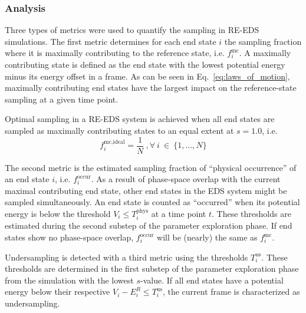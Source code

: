 \subsubsection{Analysis}
\label{metrics}
Three types of metrics were used to quantify the sampling in RE-EDS simulations. The first metric determines for each end state $i$ the sampling fraction where it is maximally contributing to the reference state, i.e. $f_i^{\text{mc}}$. A maximally contributing state is defined as the end state with the lowest potential energy minus its energy offset in a frame. As can be seen in  Eq.~\eqref{eq:laws_of_motion}, maximally contributing end states have the largest impact on the reference-state sampling at a given time point.

%
Optimal sampling in a RE-EDS system is achieved when all end states are sampled as maximally contributing states to an equal extent at $s=1.0$, i.e. 
\begin{equation}
f_{i}^{\text{mc,ideal}} = \frac{1}{N} ~, \forall ~ i~\in~ \{1, ..., N\}
\label{eq: optimalDominationSamplingDist}
\end{equation}

The second metric is the estimated sampling fraction of ``physical occurrence'' of an end state $i$, i.e. $f_i^{\text{occur}}$. As a result of phase-space overlap with the current maximal contributing end state, other end states in the EDS system might be sampled simultaneously. An end state is counted as ``occurred'' when its potential energy is below the threshold $V_i \leq T_{i}^{\text{phys}}$ at a time point $t$. 
These thresholds are estimated during the second substep of the parameter exploration phase. If end states show no phase-space overlap, $f_i^{\text{occur}}$ will be (nearly) the same as $f_i^{\text{mc}}$. 

Undersampling is detected with a third metric using the thresholds $T_{i}^{\text{us}}$. These thresholds are determined in the first substep of the parameter exploration phase from the simulation with the lowest $s$-value. If all end states have a potential energy below their respective $V_i - E^R_i \leq T_{i}^{\text{us}}$, the current frame is characterized as undersampling. \cite{Sidler2016} 

\FloatBarrier